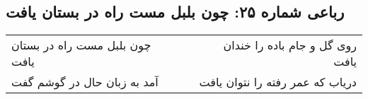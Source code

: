 \begin{center}
\section*{رباعی شماره ۲۵: چون بلبل مست راه در بستان یافت}
\label{sec:sh025}
\begin{longtable}{l p{0.5cm} r}
چون بلبل مست راه در بستان یافت
&&
روی گل و جام باده را خندان یافت
\\
آمد به زبان حال در گوشم گفت
&&
دریاب که عمر رفته را نتوان یافت
\\
\end{longtable}
\end{center}
